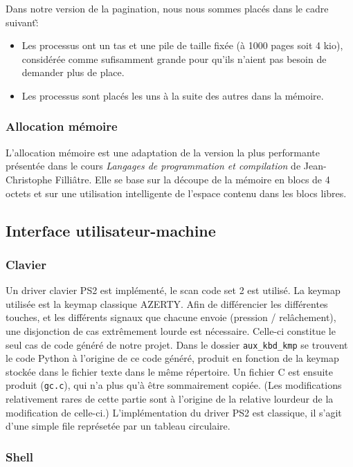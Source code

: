 \documentclass[a4paper, 11pt, twoside]{article}
\begin{document}
Dans notre version de la pagination, nous nous sommes placés dans le cadre
suivant\~:
\begin{itemize}
  \item Les processus ont un tas et une pile de taille fixée (à 1000 pages soit
    4 kio), considérée comme sufisamment grande pour qu'ils n'aient pas besoin
    de demander plus de place.
  \item Les processus sont placés les uns à la suite des autres dans la mémoire.
\end{itemize}

\subsubsection{Allocation mémoire}

L'allocation mémoire est une adaptation de la version la plus performante
présentée dans le cours \emph{Langages de programmation et compilation} de
Jean-Christophe Filliâtre. Elle se base sur la découpe de la mémoire en blocs de
4 octets et sur une utilisation intelligente de l'espace contenu dans les
blocs libres.

\subsection{Interface utilisateur-machine}

\subsubsection{Clavier}

Un driver clavier PS2 est implémenté, le scan code set 2 est utilisé. La keymap utilisée
est la keymap classique AZERTY. Afin de différencier les différentes touches, et les
différents signaux que chacune envoie (pression / relâchement), une disjonction de cas
extrêmement lourde est nécessaire. Celle-ci constitue le seul cas de code généré de notre
projet.
Dans le dossier \texttt{aux\_kbd\_kmp} se trouvent le code Python à l'origine de ce code généré,
produit en fonction de la keymap stockée dans le fichier texte dans le même répertoire.
Un fichier C est ensuite produit (\texttt{gc.c}), qui n'a plus qu'à être sommairement copiée.
(Les modifications relativement rares de cette partie sont à l'origine de la relative lourdeur
de la modification de celle-ci.)
L'implémentation du driver PS2 est classique, il s'agit d'une simple file représetée par un 
tableau circulaire.

\subsubsection{Shell}
\end{document}

